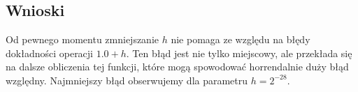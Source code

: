 \documentclass{article}
\begin{document}
        \subsection{Wnioski}
            Od pewnego momentu zmniejszanie $h$ nie pomaga ze względu na błędy dokładności operacji $1.0 + h$.
            Ten błąd jest nie tylko miejscowy, ale przekłada się na dalsze obliczenia tej funkcji, które mogą spowodować horrendalnie duży błąd względny. Najmniejszy błąd obserwujemy dla parametru $h = 2^{-28}$.
        
\end{document}
